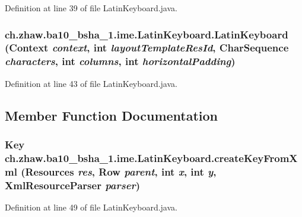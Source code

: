 Definition at line 39 of file LatinKeyboard.java.\hypertarget{classch_1_1zhaw_1_1ba10__bsha__1_1_1ime_1_1LatinKeyboard_a2614bb0eacfd8a278475184346b05820}{
\subsubsection[{LatinKeyboard}]{\setlength{\rightskip}{0pt plus 5cm}ch.zhaw.ba10\_\-bsha\_\-1.ime.LatinKeyboard.LatinKeyboard (Context {\em context}, \/  int {\em layoutTemplateResId}, \/  CharSequence {\em characters}, \/  int {\em columns}, \/  int {\em horizontalPadding})}}
\label{classch_1_1zhaw_1_1ba10__bsha__1_1_1ime_1_1LatinKeyboard_a2614bb0eacfd8a278475184346b05820}


Definition at line 43 of file LatinKeyboard.java.

\subsection{Member Function Documentation}
\hypertarget{classch_1_1zhaw_1_1ba10__bsha__1_1_1ime_1_1LatinKeyboard_a1aaff47f24e478664fe1c8b376849f2e}{
\subsubsection[{createKeyFromXml}]{\setlength{\rightskip}{0pt plus 5cm}Key ch.zhaw.ba10\_\-bsha\_\-1.ime.LatinKeyboard.createKeyFromXml (Resources {\em res}, \/  Row {\em parent}, \/  int {\em x}, \/  int {\em y}, \/  XmlResourceParser {\em parser})}}
\label{classch_1_1zhaw_1_1ba10__bsha__1_1_1ime_1_1LatinKeyboard_a1aaff47f24e478664fe1c8b376849f2e}


Definition at line 49 of file LatinKeyboard.java.

